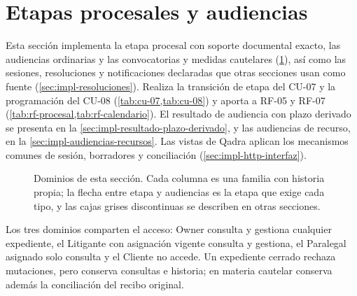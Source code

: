 
\section{Etapas procesales y audiencias}\label{sec:impl-actuaciones}

Esta sección implementa la etapa procesal con soporte documental exacto, las audiencias ordinarias y las convocatorias y medidas cautelares (\cref{fig:impl-actuaciones-panorama}), así como las sesiones, resoluciones y notificaciones declaradas que otras secciones usan como fuente (\cref{sec:impl-resoluciones}). Realiza la transición de etapa del CU-07 y la programación del CU-08 (\cref{tab:cu-07,tab:cu-08}) y aporta a RF-05 y RF-07 (\cref{tab:rf-procesal,tab:rf-calendario}). El resultado de audiencia con plazo derivado se presenta en la \cref{sec:impl-resultado-plazo-derivado}, y las audiencias de recurso, en la \cref{sec:impl-audiencias-recursos}. Las vistas de Qadra aplican los mecanismos comunes de sesión, borradores y conciliación (\cref{sec:impl-http-interfaz}).

\begin{figure}[!htbp]
  \centering
  
  \caption{Dominios de esta sección. Cada columna es una familia con historia propia; la flecha entre etapa y audiencias es la etapa que exige cada tipo, y las cajas grises discontinuas se describen en otras secciones.}
  \label{fig:impl-actuaciones-panorama}
\end{figure}

Los tres dominios comparten el acceso: Owner consulta y gestiona cualquier expediente, el Litigante con asignación vigente consulta y gestiona, el Paralegal asignado solo consulta y el Cliente no accede. Un expediente cerrado rechaza mutaciones, pero conserva consultas e historia; en materia cautelar conserva además la conciliación del recibo original.




